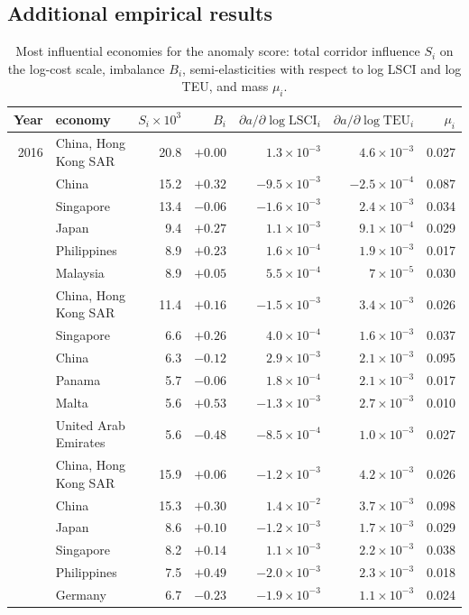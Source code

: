 \subsection{Additional empirical results}

\begin{table}[h]
\caption{Most influential economies for the anomaly score: total corridor influence $S_i$ on the log-cost scale, imbalance $B_i$, semi-elasticities with respect to log LSCI and log TEU, and mass $\mu_i$.}\label{tab:sensnodes}
\centering\footnotesize
\begin{tabular}{rlrrrrr}
\toprule
Year & economy & $S_i\times10^{3}$ & $B_i$ & $\partial a/\partial\log\mathrm{LSCI}_i$ & $\partial a/\partial\log\mathrm{TEU}_i$ & $\mu_i$\\
\midrule
2016 & China, Hong Kong SAR & 20.8 & $+0.00$ & $1.3\times10^{-3}$ & $4.6\times10^{-3}$ & 0.027\\
 & China & 15.2 & $+0.32$ & $-9.5\times10^{-3}$ & $-2.5\times10^{-4}$ & 0.087\\
 & Singapore & 13.4 & $-0.06$ & $-1.6\times10^{-3}$ & $2.4\times10^{-3}$ & 0.034\\
 & Japan & 9.4 & $+0.27$ & $1.1\times10^{-3}$ & $9.1\times10^{-4}$ & 0.029\\
 & Philippines & 8.9 & $+0.23$ & $1.6\times10^{-4}$ & $1.9\times10^{-3}$ & 0.017\\
 & Malaysia & 8.9 & $+0.05$ & $5.5\times10^{-4}$ & $7\times10^{-5}$ & 0.030\\
\addlinespace
2020 & China, Hong Kong SAR & 11.4 & $+0.16$ & $-1.5\times10^{-3}$ & $3.4\times10^{-3}$ & 0.026\\
 & Singapore & 6.6 & $+0.26$ & $4.0\times10^{-4}$ & $1.6\times10^{-3}$ & 0.037\\
 & China & 6.3 & $-0.12$ & $2.9\times10^{-3}$ & $2.1\times10^{-3}$ & 0.095\\
 & Panama & 5.7 & $-0.06$ & $1.8\times10^{-4}$ & $2.1\times10^{-3}$ & 0.017\\
 & Malta & 5.6 & $+0.53$ & $-1.3\times10^{-3}$ & $2.7\times10^{-3}$ & 0.010\\
 & United Arab Emirates & 5.6 & $-0.48$ & $-8.5\times10^{-4}$ & $1.0\times10^{-3}$ & 0.027\\
\addlinespace
2021 & China, Hong Kong SAR & 15.9 & $+0.06$ & $-1.2\times10^{-3}$ & $4.2\times10^{-3}$ & 0.026\\
 & China & 15.3 & $+0.30$ & $1.4\times10^{-2}$ & $3.7\times10^{-3}$ & 0.098\\
 & Japan & 8.6 & $+0.10$ & $-1.2\times10^{-3}$ & $1.7\times10^{-3}$ & 0.029\\
 & Singapore & 8.2 & $+0.14$ & $1.1\times10^{-3}$ & $2.2\times10^{-3}$ & 0.038\\
 & Philippines & 7.5 & $+0.49$ & $-2.0\times10^{-3}$ & $2.3\times10^{-3}$ & 0.018\\
 & Germany & 6.7 & $-0.23$ & $-1.9\times10^{-3}$ & $1.1\times10^{-3}$ & 0.024\\
\bottomrule
\end{tabular}
\end{table}

